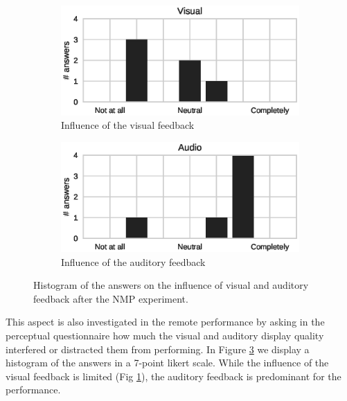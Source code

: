 \documentclass[conference]{IEEEtran}
\begin{document}
\begin{figure}[b]
	\centering
	\begin{subfigure}[t]{.48\columnwidth}
		\centering        
		\includegraphics[trim={.5cm 0cm 1cm 0cm},clip,width=\textwidth]{img/Visual}
		\caption{Influence of the visual feedback}
		\label{subfig:visual}
	\end{subfigure}
	\begin{subfigure}[t]{.48\columnwidth}
		\centering        
		\includegraphics[trim={1.5cm 0cm 0cm 0cm},clip,width=\textwidth]{img/Audio}
		\caption{Influence of the auditory feedback}
		\label{subfig:audio}
	\end{subfigure}
	\quad 
	\caption{Histogram of the answers on the influence of visual and auditory feedback after the NMP experiment.}\label{fig:va}
\end{figure}  

This aspect is also investigated in the remote performance by asking in the perceptual questionnaire how much the visual and auditory display quality interfered or distracted them from performing. In Figure \ref{fig:va} we display a histogram of the answers in a 7-point likert scale. While the influence of the visual feedback is limited (Fig \ref{subfig:visual}), the auditory feedback is predominant for the performance.
\end{document}
